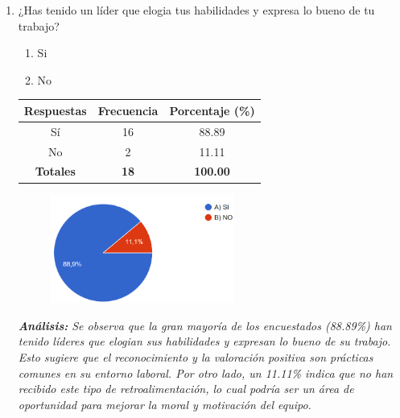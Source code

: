 \documentclass[journal]{IEEEtran}
\begin{document}
\begin{enumerate}
	\item ¿Has tenido un líder que elogia tus habilidades y expresa lo bueno de tu trabajo?
	\begin{enumerate}
		\item Si
		\item No
	\end{enumerate}
	\begin{table}[H]
		\renewcommand{\arraystretch}{1.3}
		\centering
		\begin{tabular}{|c|c|c|}
			\hline
			\textbf{Respuestas} & \textbf{Frecuencia} & \textbf{Porcentaje (\%)}\\
			\hline
			Sí & 16 & 88.89\\
			No & 2 & 11.11\\
			\hline
			\textbf{Totales} &\textbf{18}& \textbf{100.00}\\
			\hline
		\end{tabular}
	\end{table}
	\begin{figure}[h]
		\centering
		\includegraphics[width=06cm]{Pregunta18}
	\end{figure}
	\textit{\textbf{Análisis:} Se observa que la gran mayoría de los encuestados (88.89\%) han tenido líderes que elogian sus habilidades y expresan lo bueno de su trabajo. Esto sugiere que el reconocimiento y la valoración positiva son prácticas comunes en su entorno laboral. Por otro lado, un 11.11\% indica que no han recibido este tipo de retroalimentación, lo cual podría ser un área de oportunidad para mejorar la moral y motivación del equipo.}\\
	

\end{enumerate}
\end{document}
